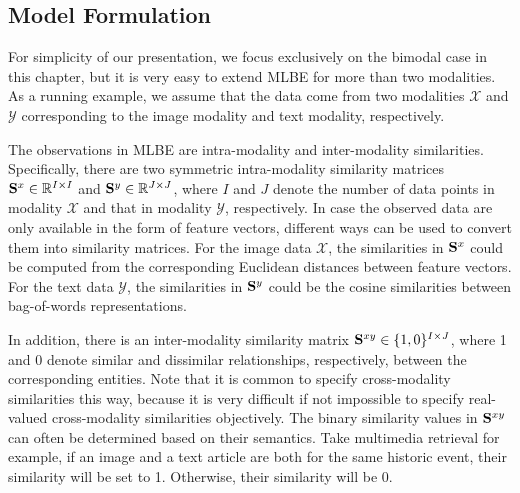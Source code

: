 
\subsection{Model Formulation}

For simplicity of our presentation, we focus exclusively on the bimodal case in this chapter, but it is very easy to extend MLBE for more than two modalities. As a running example, we assume that the data come from two modalities $\mathcal{X}$ and $\mathcal{Y}$ corresponding to the image modality and text modality, respectively.

The observations in MLBE are intra-modality and inter-modality similarities.  Specifically, there are two symmetric intra-modality similarity matrices $\S^{x}\in\mathbb{R}^{I\times I}$ and $\S^{y}\in\mathbb{R}^{J\times J} $, where $I$ and $J$ denote the number of data points in modality $\mathcal{X}$ and that in modality $\mathcal{Y}$, respectively.  In case the observed data are only available in the form of feature vectors, different ways can be used to convert them into similarity matrices.  For the image data $\mathcal{X}$, the similarities in $\S^{x}$ could be computed from the corresponding Euclidean distances between feature vectors.  For the text data $\mathcal{Y}$, the similarities in $\S^{y}$ could be the cosine similarities between bag-of-words representations.

In addition, there is an inter-modality similarity matrix $\S^{xy} \in \{1,0\}^{I\times J}$, where 1 and 0 denote similar and dissimilar relationships, respectively, between the corresponding entities.  Note that it is common to specify cross-modality similarities this way, because it is very difficult if not impossible to specify real-valued cross-modality similarities objectively.  The binary similarity values in $\S^{xy}$ can often be determined based on their semantics.  Take multimedia retrieval for example, if an image and a text article are both for the same historic event, their similarity will be set to 1.  Otherwise, their similarity will be 0.


